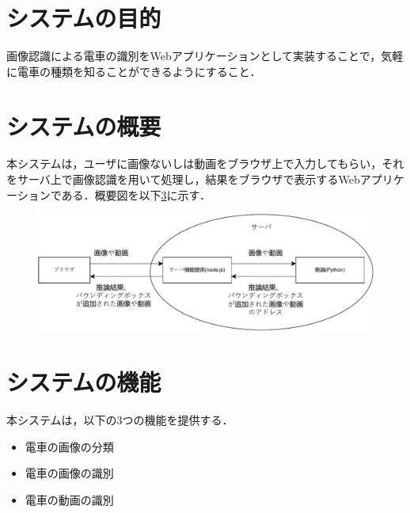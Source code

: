 \section{システムの目的}
画像認識による電車の識別をWebアプリケーションとして実装することで，気軽に電車の種類を知ることができるようにすること．
\section{システムの概要}
本システムは，ユーザに画像ないしは動画をブラウザ上で入力してもらい，それをサーバ上で画像認識を用いて処理し，結果をブラウザで表示するWebアプリケーションである．概要図を以下\ref{}に示す．
\begin{figure}
	\label{sys_gaiyou}
	\centering
	\includegraphics[width=\linewidth]{fig/sys_gaiyou.pdf}
\end{figure}

\section{システムの機能}
本システムは，以下の3つの機能を提供する．
\begin{itemize}
\item 電車の画像の分類
\item 電車の画像の識別
\item 電車の動画の識別
\end{itemize}
